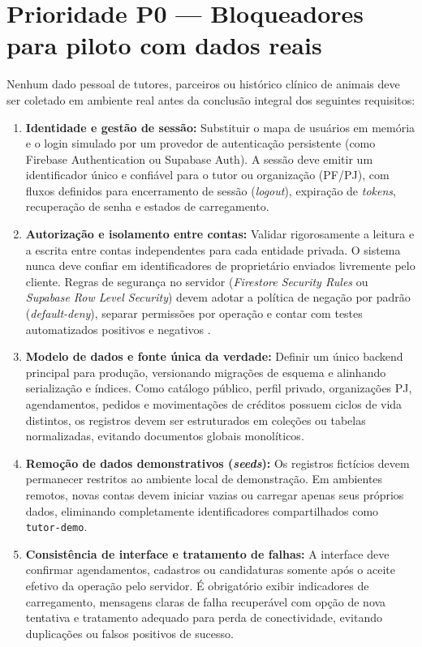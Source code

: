 \documentclass[12pt,a4paper]{article}
\begin{document}
\section{Prioridade P0 --- Bloqueadores para piloto com dados reais}
Nenhum dado pessoal de tutores, parceiros ou histórico clínico de animais deve ser coletado em ambiente real antes da conclusão integral dos seguintes requisitos:

\begin{enumerate}[leftmargin=*]
  \item \textbf{Identidade e gestão de sessão:} Substituir o mapa de usuários em memória e o login simulado por um provedor de autenticação persistente (como Firebase Authentication ou Supabase Auth). A sessão deve emitir um identificador único e confiável para o tutor ou organização (PF/PJ), com fluxos definidos para encerramento de sessão (\textit{logout}), expiração de \textit{tokens}, recuperação de senha e estados de carregamento.
  \item \textbf{Autorização e isolamento entre contas:} Validar rigorosamente a leitura e a escrita entre contas independentes para cada entidade privada. O sistema nunca deve confiar em identificadores de proprietário enviados livremente pelo cliente. Regras de segurança no servidor (\textit{Firestore Security Rules} ou \textit{Supabase Row Level Security}) devem adotar a política de negação por padrão (\textit{default-deny}), separar permissões por operação e contar com testes automatizados positivos e negativos \cite{firebase, supabase}.
  \item \textbf{Modelo de dados e fonte única da verdade:} Definir um único backend principal para produção, versionando migrações de esquema e alinhando serialização e índices. Como catálogo público, perfil privado, organizações PJ, agendamentos, pedidos e movimentações de créditos possuem ciclos de vida distintos, os registros devem ser estruturados em coleções ou tabelas normalizadas, evitando documentos globais monolíticos.
  \item \textbf{Remoção de dados demonstrativos (\textit{seeds}):} Os registros fictícios devem permanecer restritos ao ambiente local de demonstração. Em ambientes remotos, novas contas devem iniciar vazias ou carregar apenas seus próprios dados, eliminando completamente identificadores compartilhados como \texttt{tutor-demo}.
  \item \textbf{Consistência de interface e tratamento de falhas:} A interface deve confirmar agendamentos, cadastros ou candidaturas somente após o aceite efetivo da operação pelo servidor. É obrigatório exibir indicadores de carregamento, mensagens claras de falha recuperável com opção de nova tentativa e tratamento adequado para perda de conectividade, evitando duplicações ou falsos positivos de sucesso.

\end{enumerate}
\end{document}
